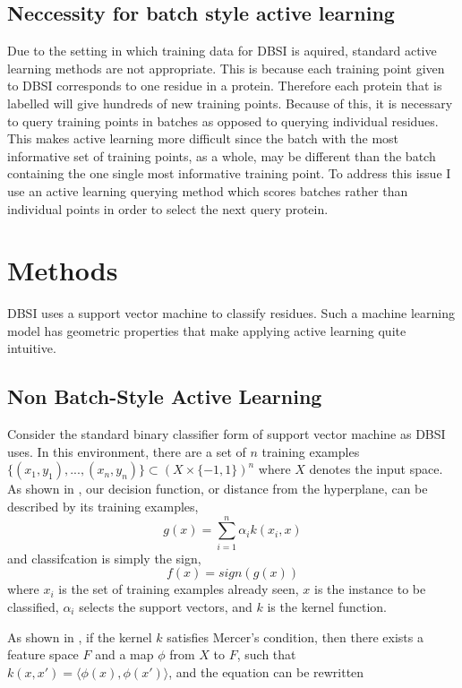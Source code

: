 \documentclass{article}
\begin{document}
\subsection*{Neccessity for batch style active learning}
Due to the setting in which training data for DBSI is aquired, standard active learning methods are not appropriate. This is because each training point given to DBSI corresponds to one residue in a protein. Therefore each protein that is labelled will give hundreds of new training points. Because of this, it is necessary to query training points in batches as opposed to querying individual residues. This makes active learning more difficult since the batch with the most informative set of training points, as a whole, may be different than the batch containing the one single most informative training point. To address this issue I use an active learning querying method which scores batches rather than individual points in order to select the next query protein.

     
\section*{Methods}
DBSI uses a support vector machine to classify residues. Such a machine learning model has geometric properties that make applying active learning quite intuitive. 

\subsection*{Non Batch-Style Active Learning}
Consider the standard binary classifier form  of support vector machine as DBSI uses.
In this environment, there are a set of $n$ training examples
$
\{(x_1,y_1),...,(x_n, y_n)\} \subset (X \times \{-1,1\})^n
$ where $X$ denotes the input space. As shown in \cite{svm}, our decision function, or distance from the hyperplane, can be described by its training examples,
\[
g(x) = \sum_{i=1}^{n} \alpha_i k( x_i, x)
\]
and classifcation is simply the sign,
\[
	f(x) = sign(g(x))
\]
where $x_i$ is the set of training examples already seen,
$x$ is the instance to be classified, $\alpha_i$ selects the support vectors, and $k$ is the kernel function.

As shown in \cite{active_learning}, if the kernel $k$ satisfies Mercer's condition, then there exists a feature space $F$ and a map $\phi$ from $X$ to $F$, such that $k(x,x') = \langle \phi(x) , \phi(x') \rangle$, and the equation can be rewritten 
 
\end{document}
